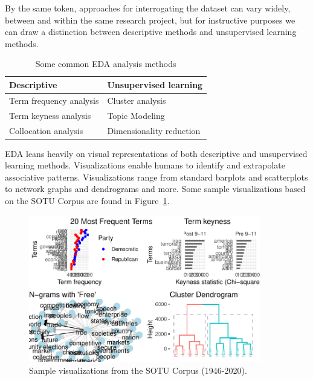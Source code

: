 \documentclass[
  letterpaper,
]{latex/krantz}
\begin{document}
By the same token, approaches for interrogating the dataset can vary
widely, between and within the same research project, but for
instructive purposes we can draw a distinction between descriptive
methods and unsupervised learning methods.

\hypertarget{tbl-eda-approaches-table}{}
\begin{table}
\caption{\label{tbl-eda-approaches-table}Some common EDA analysis methods }\tabularnewline

\centering
\begin{tabular}{ll}
\toprule
Descriptive & Unsupervised learning\\
\midrule
Term frequency analysis & Cluster analysis\\
Term keyness analysis & Topic Modeling\\
Collocation analysis & Dimensionality reduction\\
\bottomrule
\end{tabular}
\end{table}

EDA leans heavily on visual representations of both descriptive and
unsupervised learning methods. Visualizations enable humans to identify
and extrapolate associative patterns. Visualizations range from standard
barplots and scatterplots to network graphs and dendrograms and more.
Some sample visualizations based on the SOTU Corpus are found in
Figure~\ref{fig-eda-visualizations-grid}.

\begin{figure}

{\centering \includegraphics[width=0.9\textwidth,height=\textheight]{./approaching-analysis_files/figure-pdf/fig-eda-visualizations-grid-1.pdf}

}

\caption{\label{fig-eda-visualizations-grid}Sample visualizations from
the SOTU Corpus (1946-2020).}

\end{figure}
\end{document}
